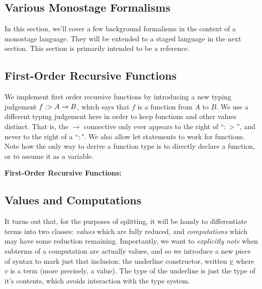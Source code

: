 \documentclass[]{article}
\begin{document}
\begin{abstrsyn}
\section{Various Monostage Formalisms}

In this section, we'll cover a few background formalisms in the context of a monostage language.
They will be extended to a staged language in the next section.
This section is primarily intended to be a reference.

\subsection{First-Order Recursive Functions}

We implement first order recursive functions by introducing a new typing judgement \mbox{$f :> A \to B$},
which says that $f$ is a function from $A$ to $B$.  
We use a different typing judgement here in order to keep functions and other values distinct.
That is, the $\to$ connective only ever appears to the right of ``$:>$'', and never to the right of a ``$:$".
We also allow let statements to work for functions.
Note how the only way to derive a function type is to directly declare a function, or to assume it as a variable.
\begin{framed}
\noindent\textbf{First-Order Recursive Functions:}
\end{framed}

\subsection{Values and Computations}

It turns out that, for the purposes of splitting, it will be handy to differentiate terms into two classes: 
\emph{values} which are fully reduced, and \emph{computations} which may have some reduction remaining.
Importantly, we want to \emph{explicitly note} when subterms of a computation are actually values,
and so we introduce a new piece of syntax to mark just that inclusion: the underline constructor, written $\underline{v}$
where $v$ is a term (more precisely, a value).  
The type of the underline is just the type of it's contents, which avoids interaction with the type system.


\end{abstrsyn}
\end{document}

